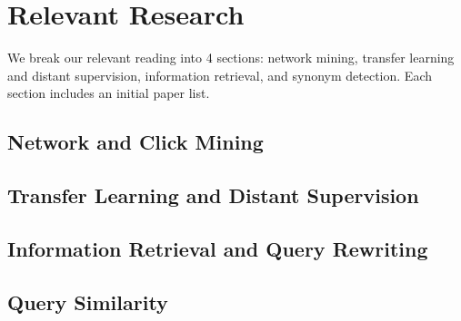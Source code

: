 \section{Relevant Research}
We break our relevant reading into 4 sections: network mining, transfer learning and distant supervision, information retrieval, and synonym detection. Each section includes an initial paper list.
\subsection{Network and Click Mining}
\cite{Li2013EnhancedIR}
\cite{Cao2008ContextawareQS}
\cite{Hua2013ClickageTB}
\cite{Chuklin2013ClickMI}
\cite{Kacprzak2017AQL}
\cite{FournierViger2017ASO}
\cite{Ghosh2012ATR}
\subsection{Transfer Learning and Distant Supervision}
\cite{Mintz2009DistantSF}
\cite{Hedderich2020TransferLA}
\cite{Xu2020QueryFM}
\cite{Ji2017DistantSF}
\cite{Mitra2020NeuralMF}
\subsection{Information Retrieval and Query Rewriting}
\cite{Strohman2005IndriA}
\cite{Cheriton2019FromDT}
\cite{Jiang2016LearningQA}
\cite{Radlinski2010InferringQI}
\subsection{Query Similarity}
\cite{Ansari2020IdentifyingSD}
\cite{10.1145/3292500.3330914}
\cite{Sharma2019NaturalLU}
\cite{Viswanathan2019DetectionOD}
\cite{Bona2010LearningDM}